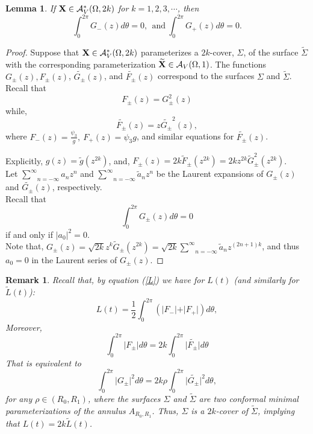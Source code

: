 \documentclass[11pt]{amsart}
\newtheorem{lem}[thm]{Lemma}
\newtheorem{rem}[thm]{\bf{Remark}}
\numberwithin{equation}{section}
\theoremstyle{theorem}
\theoremstyle{definition}
\numberwithin{equation}{section}
\begin{document}
\begin{lem} \label{lem: A* implies int G =0}
    If $\bold{X} \in \mathcal{A}_V^*(\Omega ,2k)$ for $k=1,2,3,\cdots$, then 
    $$
    \int_0^{2\pi} G_-(z)d\theta =0,\ \ \text{and}\  \int_0^{2\pi} G_+(z)d\theta =0.
    $$ 
\end{lem}
\begin{proof}
    Suppose that $\bold{X} \in \mathcal{A}_V^*(\Omega ,2k)$ parameterizes a $2k$-cover, $\Sigma$, of the surface $\widetilde{\Sigma}$ with the corresponding parameterization $\widetilde{\bold{X}} \in \mathcal{A}_V(\Omega ,1)$. The functions $G_{\pm}(z), F_{\pm}(z)$, $\widetilde{G_{\pm}}(z)$, and $ \widetilde{F_{\pm}}(z)$ correspond to the surfaces $\Sigma$ and $\widetilde{\Sigma}$. Recall that
    $$
    F_{\pm}(z)=G_{\pm}^2(z)  
    $$
    while, 
    $$
    \widetilde{F_{\pm}}(z)=z \widetilde{G_{\pm}}^2(z),
    $$
    where $F_-(z)=\frac{\psi_3}{g},\ F_+(z)=\psi_3g$, and similar equations for $\widetilde{F_{\pm}}(z)$. 
     \medskip
     
     Explicitly, 
     $
     g(z)=\widetilde{g}(z^{2k})$, and, $F_{\pm}(z)=2k\widetilde{F}_{\pm}(z^{2k})=2kz^{2k}\widetilde{G}^2_{\pm}(z^{2k})$.\\
   Let $\underset{n=-\infty}{\overset{\infty}{\sum}}  a_n z^n$ and $\underset{n=-\infty}{\overset{\infty}{\sum}}  \widetilde{a}_n z^n$ be the Laurent expansions of $G_{\pm}(z)$ and $\widetilde{G_{\pm}}(z)$, respectively.\\
   Recall that 
    $$
    \int_0^{2\pi}  G_{\pm}(z) d\theta =0
    $$
    if and only if $\vert a_0\vert^2 =0$. \\
    Note that, $G_{\pm}(z)=\sqrt{2k}z^k\widetilde{G}_{\pm}(z^{2k})=\sqrt{2k} \underset{n=-\infty}{\overset{\infty}{\sum}}  \widetilde{a}_n z^{(2n+1)k}$, and thus $a_0=0$ in the Laurent series of $G_{\pm}(z)$. 
    \end{proof}

    \begin{rem}
        \rm
    Recall that, by equation (\ref{L}) we have for $L(t)$ (and similarly for $\widetilde{L}(t)$):
    $$
    L(t)=\frac{1}{2}\int_0^{2\pi} (\vert F_-\vert +\vert F_+\vert )d\theta ,
    $$
   Moreover,
    $$
    \int_0^{2\pi}\vert F_{\pm}\vert d\theta =2k \int_0^{2\pi} \vert \widetilde{F_{\pm}} \vert d\theta
    $$
    That is equivalent to
    $$
    \int_0^{2\pi}\vert G_{\pm}\vert^2 d\theta =2k\rho \int_0^{2\pi} \vert \widetilde{G_{\pm}} \vert^2 d\theta ,
    $$
    for any $\rho \in (R_0,R_1)$, where the surfaces $\Sigma$ and $\widetilde{\Sigma}$ are two conformal minimal parameterizations of the annulus $A_{R_0,R_1}$. 
    Thus, $\Sigma$ is a $2k$-cover of $\widetilde{\Sigma}$, implying that $ L(t)=2k\widetilde{L}(t)$. 
 \end{rem}
\end{document}
